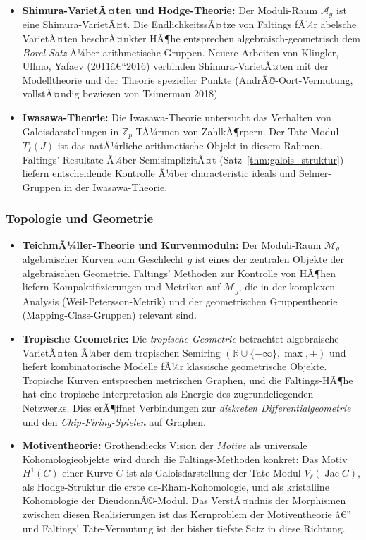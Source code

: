﻿\documentclass[12pt,a4paper]{article}
\theoremstyle{plain}
\theoremstyle{definition}
\theoremstyle{remark}
\newcommand{\Z}{\mathbb{Z}}
\newcommand{\R}{\mathbb{R}}
\DeclareMathOperator{\Jac}{Jac}
\begin{document}
\begin{itemize}[leftmargin=2em,itemsep=4pt]
  \item \textbf{Shimura-VarietÃ¤ten und Hodge-Theorie:}
    Der Moduli-Raum $\mathcal A_g$ ist eine Shimura-VarietÃ¤t. Die EndlichkeitssÃ¤tze
    von Faltings fÃ¼r abelsche VarietÃ¤ten beschrÃ¤nkter HÃ¶he entsprechen
    algebraisch-geometrisch dem \emph{Borel-Satz} Ã¼ber arithmetische Gruppen.
    Neuere Arbeiten von Klingler, Ullmo, Yafaev (2011â€“2016) verbinden Shimura-VarietÃ¤ten
    mit der Modelltheorie und der Theorie spezieller Punkte (AndrÃ©-Oort-Vermutung,
    vollstÃ¤ndig bewiesen von Tsimerman 2018).

  \item \textbf{Iwasawa-Theorie:}
    Die Iwasawa-Theorie untersucht das Verhalten von Galoisdarstellungen in
    $\Z_p$-TÃ¼rmen von ZahlkÃ¶rpern. Der Tate-Modul $T_\ell(J)$ ist das natÃ¼rliche
    arithmetische Objekt in diesem Rahmen. Faltings' Resultate Ã¼ber SemisimplizitÃ¤t
    (Satz~\ref{thm:galois_struktur}) liefern entscheidende Kontrolle Ã¼ber
    characteristic ideals und Selmer-Gruppen in der Iwasawa-Theorie.
\end{itemize}

\subsubsection{Topologie und Geometrie}

\begin{itemize}[leftmargin=2em,itemsep=4pt]
  \item \textbf{TeichmÃ¼ller-Theorie und Kurvenmoduln:}
    Der Moduli-Raum $\mathcal M_g$ algebraischer Kurven vom Geschlecht $g$ ist eines
    der zentralen Objekte der algebraischen Geometrie. Faltings' Methoden zur Kontrolle
    von HÃ¶hen liefern Kompaktifizierungen und Metriken auf $\mathcal M_g$,
    die in der komplexen Analysis (Weil-Petersson-Metrik) und der
    geometrischen Gruppentheorie (Mapping-Class-Gruppen) relevant sind.

  \item \textbf{Tropische Geometrie:}
    Die \emph{tropische Geometrie} betrachtet algebraische VarietÃ¤ten Ã¼ber dem
    tropischen Semiring $(\R \cup \{-\infty\}, \max, +)$ und liefert kombinatorische
    Modelle fÃ¼r klassische geometrische Objekte. Tropische Kurven entsprechen
    metrischen Graphen, und die Faltings-HÃ¶he hat eine tropische Interpretation als
    Energie des zugrundeliegenden Netzwerks. Dies erÃ¶ffnet Verbindungen zur
    \emph{diskreten Differentialgeometrie} und den \emph{Chip-Firing-Spielen} auf Graphen.

  \item \textbf{Motiventheorie:}
    Grothendiecks Vision der \emph{Motive} als universale Kohomologieobjekte wird durch
    die Faltings-Methoden konkret: Das Motiv $H^1(C)$ einer Kurve $C$ ist als
    Galoisdarstellung der Tate-Modul $V_\ell(\Jac C)$, als Hodge-Struktur die
    erste de-Rham-Kohomologie, und als kristalline Kohomologie der DieudonnÃ©-Modul.
    Das VerstÃ¤ndnis der Morphismen zwischen diesen Realisierungen ist das Kernproblem
    der Motiventheorie â€” und Faltings' Tate-Vermutung ist der bisher tiefste Satz
    in diese Richtung.
\end{itemize}
\end{document}
